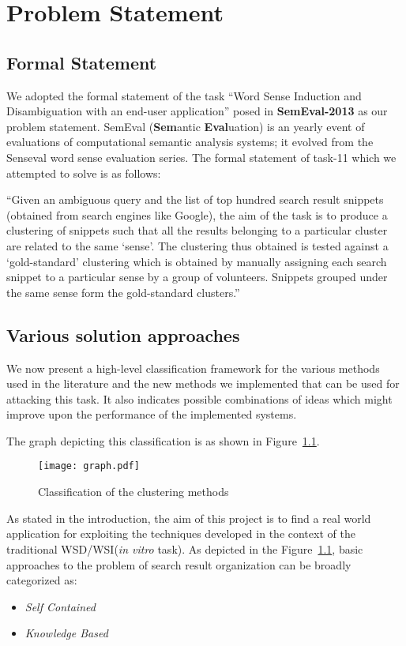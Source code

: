 \documentclass[a4paper,12pt]{report}
\begin{document}
\chapter{Problem Statement}
\section{Formal Statement}
We adopted the formal statement of the task ``Word Sense Induction and
Disambiguation with an end-user application'' posed in {\bf
  SemEval-2013} as our problem statement. SemEval ({\bf Sem}antic
{\bf Eval}uation) is an yearly event of evaluations of computational
semantic analysis systems; it evolved from the Senseval word sense
evaluation series. The formal statement of task-11 which we attempted to solve
is as follows: 

``Given an ambiguous query and the list of top hundred search result
snippets (obtained from search engines like Google), the aim of the
task is to produce a clustering of snippets such that all the results
belonging to a particular cluster are related to the same `sense'. The
clustering thus obtained is tested against a `gold-standard'
clustering which is obtained by manually assigning each search snippet
to a particular sense by a group of volunteers. Snippets grouped under
the same sense form the gold-standard clusters.''

\section{Various solution approaches}
We now present a high-level classification framework for the various
methods used in the literature and the new methods we implemented that
can be used for attacking this task. It also indicates possible
combinations of ideas which might improve upon the performance of
the implemented systems.

The graph depicting this classification is as shown in Figure~\ref{fig:classify}.

\begin{figure}[h]
  \centering
  \texttt{[image: graph.pdf]}
  \caption{Classification of the clustering methods}
  \label{fig:classify}
\end{figure}

As stated in the introduction, the aim of this project is to find a
real world application for exploiting the techniques developed in the
context of the traditional WSD/WSI({\it in vitro} task). As depicted
in the Figure~\ref{fig:classify}, basic approaches to the problem of
search result organization can be broadly categorized as:
\begin{itemize}
  \item {\it Self Contained}
  \item {\it Knowledge Based}
\end{itemize}
\end{document}
